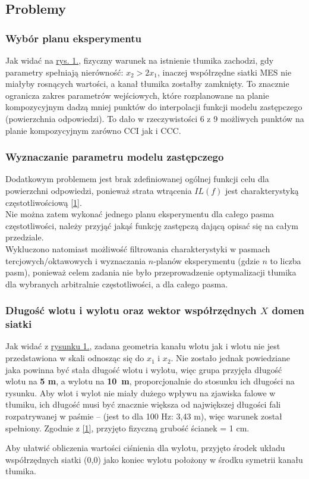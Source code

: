 \documentclass{sprawozdanie-agh}
\begin{document}
\subsection{Problemy}
\subsubsection{Wybór planu eksperymentu}
    Jak widać na \hyperref[rysunek]{rys. 1.}, fizyczny warunek na istnienie tłumika zachodzi, gdy parametry spełniają nierówność: $x_2> 2 x_1$, inaczej współrzędne siatki MES nie miałyby rosnących wartości, a kanał tłumika zostałby zamknięty. To znacznie ogranicza zakres parametrów wejściowych, które rozplanowane na planie kompozycyjnym dadzą mniej punktów do interpolacji funkcji modelu zastępczego (powierzchnia odpowiedzi). To dało w rzeczywistości 6 z 9 możliwych punktów na planie kompozycyjnym zarówno CCI jak i CCC.\newpage \vspace{-0.6cm}
\subsubsection{Wyznaczanie parametru modelu zastępczego}
    Dodatkowym problemem jest brak zdefiniowanej ogólnej funkcji celu dla powierzchni odpowiedzi, ponieważ strata wtrącenia $IL(f)$ jest charakterystyką częstotliwościową \hyperref[ref1]{[1]}.\\Nie można zatem wykonać jednego planu eksperymentu dla całego pasma częstotliwości, należy przyjąć jakąś funkcję zastępczą dającą opisać się na całym przedziale. \\ Wykluczono natomiast możliwość filtrowania charakterystyki w pasmach tercjowych/oktawowych i wyznaczania $n$-planów eksperymentu (gdzie $n$ to liczba pasm), ponieważ celem zadania nie było przeprowadzenie optymalizacji tłumika dla wybranych arbitralnie częstotliwości, a dla całego pasma.
    \subsubsection{Długość wlotu i wylotu oraz wektor współrzędnych $X$ domen siatki}
    Jak widać z \hyperref[rysunek]{rysunku 1.}, zadana geometria kanału wlotu jak i wlotu nie jest przedstawiona w skali odnosząc się do $x_1$ i $x_2$. Nie zostało jednak powiedziane jaka powinna być stała długość wlotu i wylotu, więc grupa przyjęła długość wlotu na \textbf{5 m}, a wylotu na \textbf{10~m}, proporcjonalnie do stosunku ich długości na rysunku. Aby wlot i wylot nie miały dużego wpływu na zjawiska falowe w tłumiku, ich długość musi być znacznie większa od największej długości fali rozpatrywanej w paśmie -- (jest to dla 100 Hz: 3,43 m), więc warunek został spełniony. Zgodnie z \hyperref[ref1]{[1]}, przyjęto fizyczną grubość ścianek = 1 cm.
    \par Aby ułatwić obliczenia wartości ciśnienia dla wylotu, przyjęto środek układu współrzędnych siatki (0,0) jako koniec wylotu położony w środku symetrii kanału tłumika.
\end{document}
